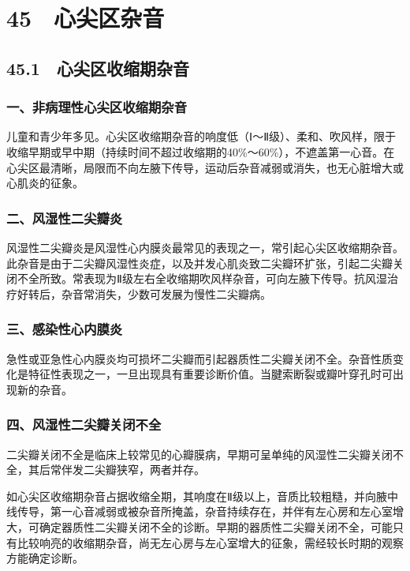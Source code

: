 \protect\hypertarget{text00124.html}{}{}

\section{45　心尖区杂音}

\subsection{45.1　心尖区收缩期杂音}

\subsubsection{一、非病理性心尖区收缩期杂音}

儿童和青少年多见。心尖区收缩期杂音的响度低（Ⅰ～Ⅱ级）、柔和、吹风样，限于收缩早期或早中期（持续时间不超过收缩期的40\%～60\%），不遮盖第一心音。在心尖区最清晰，局限而不向左腋下传导，运动后杂音减弱或消失，也无心脏增大或心肌炎的征象。

\subsubsection{二、风湿性二尖瓣炎}

风湿性二尖瓣炎是风湿性心内膜炎最常见的表现之一，常引起心尖区收缩期杂音。此杂音是由于二尖瓣风湿性炎症，以及并发心肌炎致二尖瓣环扩张，引起二尖瓣关闭不全所致。常表现为Ⅱ级左右全收缩期吹风样杂音，可向左腋下传导。抗风湿治疗好转后，杂音常消失，少数可发展为慢性二尖瓣病。

\subsubsection{三、感染性心内膜炎}

急性或亚急性心内膜炎均可损坏二尖瓣而引起器质性二尖瓣关闭不全。杂音性质变化是特征性表现之一，一旦出现具有重要诊断价值。当腱索断裂或瓣叶穿孔时可出现新的杂音。

\subsubsection{四、风湿性二尖瓣关闭不全}

二尖瓣关闭不全是临床上较常见的心瓣膜病，早期可呈单纯的风湿性二尖瓣关闭不全，其后常伴发二尖瓣狭窄，两者并存。

如心尖区收缩期杂音占据收缩全期，其响度在Ⅱ级以上，音质比较粗糙，并向腋中线传导，第一心音减弱或被杂音所掩盖，杂音持续存在，并伴有左心房和左心室增大，可确定器质性二尖瓣关闭不全的诊断。早期的器质性二尖瓣关闭不全，可能只有比较响亮的收缩期杂音，尚无左心房与左心室增大的征象，需经较长时期的观察方能确定诊断。

